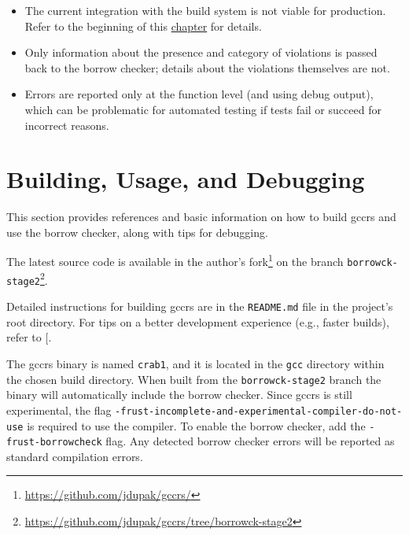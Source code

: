 \documentclass[
  11pt,
  twoside]{report}
\newenvironment{Shaded}{}{}
\newcommand{\NormalTok}[1]{#1}
\providecommand{\tightlist}{%
  \setlength{\itemsep}{0pt}\setlength{\parskip}{0pt}}
\DeclareRobustCommand{\href}[2]{#2\footnote{\url{#1}}}
\begin{document}
\begin{itemize}
\tightlist
\item
  The current integration with the build system is not viable for
  production. Refer to the beginning of this
  \hyperref[implementation]{chapter} for details.
\item
  Only information about the presence and category of violations is
  passed back to the borrow checker; details about the violations
  themselves are not.
\item
  Errors are reported only at the function level (and using debug
  output), which can be problematic for automated testing if tests fail
  or succeed for incorrect reasons.
\end{itemize}

\section{Building, Usage, and
Debugging}\label{sec:building-usage-and-debugging}

This section provides references and basic information on how to build
gccrs and use the borrow checker, along with tips for debugging.

The latest source code is available in the author's
\href{https://github.com/jdupak/gccrs/}{fork} on the branch
\href{https://github.com/jdupak/gccrs/tree/borrowck-stage2}{\texttt{borrowck-stage2}}.

Detailed instructions for building gccrs are in the \texttt{README.md}
file in the project's root directory. For tips on a better development
experience (e.g., faster builds), refer to {[}\citeproc{ref-svp}{19}{]}.

The gccrs binary is named \texttt{crab1}, and it is located in the
\texttt{gcc} directory within the chosen build directory. When built
from the \texttt{borrowck-stage2} branch the binary will automatically
include the borrow checker. Since gccrs is still experimental, the flag
\texttt{-frust-incomplete-and-experimental-compiler-do-not-use} is
required to use the compiler. To enable the borrow checker, add the
\texttt{-frust-borrowcheck} flag. Any detected borrow checker errors
will be reported as standard compilation errors.

\begin{quote}
\begin{Shaded}
\end{Shaded}
\end{quote}
\end{document}
